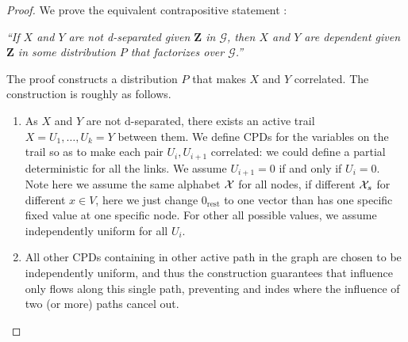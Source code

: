 \documentclass{article}
\begin{document}
\begin{proof} We prove the equivalent contrapositive statement :

\emph{``If $X$ and $Y$ are not d-separated given $\boldsymbol{Z}$ in $\mathcal{G}$, then $X$ and $Y$ are dependent given $\boldsymbol{Z}$ in some distribution $P$ that factorizes over $\mathcal{G}$.''}

The proof constructs a distribution $P$ that makes $X$ and $Y$ correlated. The construction is roughly as follows. 
\begin{enumerate}
    \item As $X$ and $Y$ are not d-separated, there exists an active trail $X=U_{1}, \ldots, U_{k}=Y$ between them. We define CPDs for the variables on the trail so as to make each pair $U_{i}, U_{i+1}$ correlated: we could define a partial deterministic for all the links. We assume $U_{i+1}=0$ if and only if $U_{i}=0$. Note here we assume the same alphabet $\mathcal{X}$ for all nodes, if different $\mathcal{X}_s$ for different $x\in V$, here we just change $0_{\mathrm{rest}}$ to one  vector than has one specific fixed value at one specific node. For other all possible values, we assume independently uniform for all $U_{i}$.
    \item All other CPDs containing in other active path in the graph are chosen to be independently uniform, and thus the construction guarantees that influence only flows along this single path, preventing and indes where the influence of two (or more) paths cancel out.
\end{enumerate} 
\end{proof}
\end{document}
